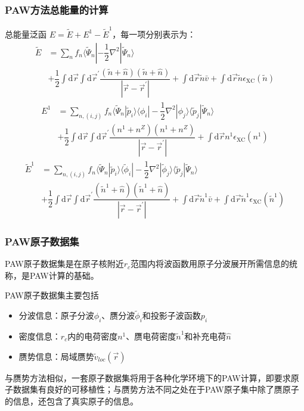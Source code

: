 \documentclass[cjk,slidestop,compress,mathserif,blue]{beamer}
\begin{document}
\frame
{
\frametitle{\textrm{PAW}方法总能量的计算}
总能量泛函
$E=\tilde E+E^1-\tilde E^1$，每一项分别表示为：
\begin{displaymath}
	\begin{aligned}
		\tilde E&=\sum_nf_n\langle\tilde\Psi_n|-\dfrac12\nabla^2|\tilde\Psi_n\rangle\\
		 &+\dfrac12\int\mathrm{d}\vec r\int\mathrm{d}\vec r^{\prime}\dfrac{(\tilde n+\hat n)(\tilde n+\hat n)}{|\vec r-\vec r^{\prime}|}+\int\mathrm{d}\vec r \tilde n\bar v+\int\mathrm{d}\vec r \tilde n\epsilon_{\mathrm{XC}}(\tilde n)
 	\end{aligned}
\end{displaymath}
\begin{displaymath}
	\begin{aligned}
		E^1&=\sum_{n,(i,j)}f_n\langle\tilde\Psi_n|\tilde p_i\rangle\langle\phi_i|-\dfrac12\nabla^2|\phi_j\rangle\langle\tilde p_j|\tilde\Psi_n\rangle\\
		 &+\dfrac12\int\mathrm{d}\vec r\int\mathrm{d}\vec r^{\prime}\dfrac{(n^1+n^Z)(n^1+n^Z)}{|\vec r-\vec r^{\prime}|}+\int\mathrm{d}\vec r n^1\epsilon_{\mathrm{XC}}(n^1)
 	\end{aligned}
\end{displaymath}
\begin{displaymath}
	\begin{aligned}
		\tilde E^1&=\sum_{n,(i,j)}f_n\langle\tilde\Psi_n|\tilde p_i\rangle\langle\tilde\phi_i|-\dfrac12\nabla^2|\tilde\phi_j\rangle\langle\tilde p_j|\tilde\Psi_n\rangle\\
		 &+\dfrac12\int\mathrm{d}\vec r\int\mathrm{d}\vec r^{\prime}\dfrac{(\tilde n^1+\hat n)(\tilde n^1+\hat n)}{|\vec r-\vec r^{\prime}|}+\int\mathrm{d}\vec r \tilde n^1\bar v+\int\mathrm{d}\vec r \tilde n^1\epsilon_{\mathrm{XC}}(\tilde n^1)
 	\end{aligned}
\end{displaymath}
}

\frame
{
	\frametitle{\textrm{PAW}原子数据集}
\textrm{PAW}原子数据集是在原子核附近$r_c$范围内将波函数用原子分波展开所需信息的统称，是\textrm{PAW}计算的基础。

\textrm{PAW}原子数据集主要包括
	\begin{itemize}
		\item 分波信息：原子分波$\phi_i$、赝分波$\tilde\phi_i$和投影子波函数$p_i$
		\item 密度信息：$r_c$内的电荷密度$n^1$、赝电荷密度$\tilde n^1$和补充电荷$\hat n$
		\item 赝势信息：局域赝势$\tilde v_{loc}(\vec r)$
	\end{itemize}
	与赝势方法相似，一套原子数据集将用于各种化学环境下的\textrm{PAW}计算，即要求原子数据集有良好的可移植性；与赝势方法不同之处在于\textrm{PAW}原子集中除了赝原子的信息，还包含了真实原子的信息。
}
\end{document}
